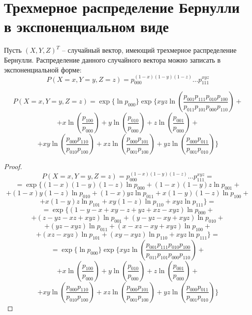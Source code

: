 \section{Трехмерное распределение Бернулли в экспоненциальном виде}
Пусть $(X,Y,Z)^T$ -- случайный вектор, имеющий трехмерное распределение Бернулли.
Распределение данного случайного вектора можно записать в экспоненциальной форме:
$$P(X=x,Y=y,Z=z)=p_{000}^{(1-x)(1-y)(1-z)} \ldots p_{111}^{x y z}$$

\begin{lemma}\label{factorization}
    $$
    P(X=x,Y=y,Z=z)= \exp \Biggl\{ \ln p_{000} \Biggr\}
        \exp \Biggl\{  xyz \ln  \left(\dfrac{p_{001}p_{111}p_{010}p_{100}}{p_{011}p_{101}p_{000}p_{110}}\right) +$$
    $$ +
        x \ln\left(\dfrac{p_{100}}{p_{000}}\right) +  y \ln\left(\dfrac{p_{010}}{p_{000}}\right) +
        z \ln\left(\dfrac{p_{001}}{p_{000}}\right) +
    $$
    $$
        + xy \ln \left(\dfrac{p_{000}p_{110}}{p_{010}p_{100}}\right) +
        xz \ln \left(\dfrac{p_{000}p_{101}}{p_{001}p_{100}}\right) +
        yz \ln \left(\dfrac{p_{000}p_{011}}{p_{001}p_{010}}\right) \Biggr\}
    $$
\end{lemma}

\begin{proof}
    $$
    P(X=x,Y=y,Z=z) = p_{000}^{(1-x)(1-y)(1-z)} \ldots p_{111}^{x y z} =
    $$
    $$
        =\exp \Biggl\{ (1-x)(1-y)(1-z) \ln p_{000} +
        (1-x)(1-y)z \ln p_{001}+
    $$
    $$
        + (1-x)y(1-z) \ln p_{010} + (1-x)y z \ln p_{011} +  x(1-y)(1-z) \ln p_{100} +
    $$
    $$
        +   x(1-y) z \ln p_{101}
        +   x y (1-z) \ln p_{110} +   x y z \ln p_{111} \Biggr\} =
    $$
    $$
        =\exp \Biggl\{   ( 1 - y -  x +  x y
        -  z +  y z +  x z -  x y z ) \ln p_{000} +
    $$
    $$
        +    (z -  y z -  x z +  x y z) \ln p_{001}  +
          (y -  y z -  x y +  x y z)  \ln p_{010} +
    $$
    $$
        +    (y z -  x y z ) \ln p_{011} +
           (x -  x z -  x y +  x y z ) \ln p_{100} +
    $$
    $$
        +   (x z -  x y z ) \ln p_{101} +   (x y -  x y z) \ln p_{110} +
          x y z \ln p_{111} \Biggr\}=
    $$
    $$
        = \exp \Biggl\{ \ln p_{000} \Biggr\}
        \exp \Biggl\{  xyz \ln  \left(\dfrac{p_{001}p_{111}p_{010}p_{100}}{p_{011}p_{101}p_{000}p_{110}}\right) +$$
    $$ +
        x \ln\left(\dfrac{p_{100}}{p_{000}}\right) +  y \ln\left(\dfrac{p_{010}}{p_{000}}\right) +
        z \ln\left(\dfrac{p_{001}}{p_{000}}\right) +
    $$
    $$
        + xy \ln \left(\dfrac{p_{000}p_{110}}{p_{010}p_{100}}\right) +
        xz \ln \left(\dfrac{p_{000}p_{101}}{p_{001}p_{100}}\right) +
        yz \ln \left(\dfrac{p_{000}p_{011}}{p_{001}p_{010}}\right) \Biggr\}
    $$
\end{proof}
